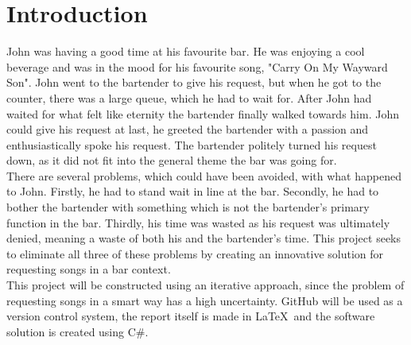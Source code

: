 \chapter{Introduction}
John was having a good time at his favourite bar. He was enjoying a cool beverage and was in the mood for his favourite song, "Carry On My Wayward Son". John went to the bartender to give his request, but when he got to the counter, there was a large queue, which he had to wait for. After John had waited for what felt like eternity the bartender finally walked towards him. John could give his request at last, he greeted the bartender with a passion and enthusiastically spoke his request. The bartender politely turned his request down, as it did not fit into the general theme the bar was going for.\\

There are several problems, which could have been avoided, with what happened to John. Firstly, he had to stand wait in line at the bar. Secondly, he had to bother the bartender with something which is not the bartender's primary function in the bar. Thirdly, his time was wasted as his request was ultimately denied, meaning a waste of both his and the bartender's time.
This project seeks to eliminate all three of these problems by creating an innovative solution for requesting songs in a bar context.\\

This project will be constructed using an iterative approach, since the problem of requesting songs in a smart way has a high uncertainty. GitHub will be used as a version control system, the report itself is made in \LaTeX\ and the software solution is created using C\#.